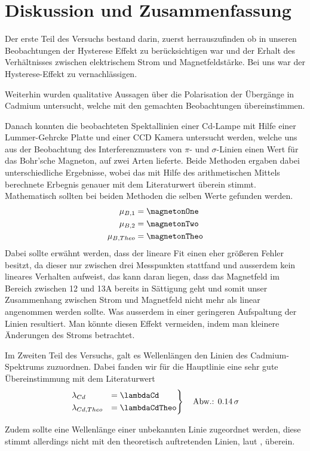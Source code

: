 \section{Diskussion und Zusammenfassung}
  Der erste Teil des Versuchs bestand darin, zuerst herrauszufinden ob in unseren Beobachtungen der Hysterese Effekt zu berücksichtigen war und der Erhalt des Verhältnisses zwischen elektrischem Strom und Magnetfeldstärke.
  Bei uns war der Hysterese-Effekt zu vernachlässigen.

  Weiterhin wurden qualitative Aussagen über die Polarisation der Übergänge in Cadmium untersucht, welche mit den gemachten Beobachtungen übereinstimmen.

  Danach konnten die beobachteten Spektallinien einer Cd-Lampe mit Hilfe einer Lummer-Gehrcke Platte und einer CCD Kamera untersucht werden, welche uns aus der Beobachtung des Interferenzmusters von $\pi$- und $\sigma$-Linien einen Wert für das Bohr'sche Magneton, auf zwei Arten lieferte. Beide Methoden ergaben dabei unterschiedliche Ergebnisse, wobei das mit Hilfe des arithmetischen Mittels berechnete Erbegnis genauer mit dem Literaturwert überein stimmt. Mathematisch sollten bei beiden Methoden die selben Werte gefunden werden.
  \begin{align*}
    \mu_{B,1} &= \magnetonOne\\
    \mu_{B,2} &= \magnetonTwo\\
    \mu_{B,Theo} & = \magnetonTheo
  \end{align*}
  Dabei sollte erwähnt werden, dass der lineare Fit einen eher größeren Fehler besitzt, da dieser nur zwischen drei Messpunkten stattfand und ausserdem kein lineares Verhalten aufweist, das kann daran liegen, dass das Magnetfeld im Bereich zwischen 12 und 13A bereits in Sättigung geht und somit unser Zusammenhang zwischen Strom und Magnetfeld nicht mehr als linear angenommen werden sollte. Was ausserdem in einer geringeren Aufspaltung der Linien resultiert.
  Man könnte diesen Effekt vermeiden, indem man kleinere Änderungen des Stroms betrachtet.

  Im Zweiten Teil des Versuchs, galt es Wellenlängen den Linien des Cadmium-Spektrums zuzuordnen. Dabei fanden wir für die Hauptlinie eine sehr gute Übereinstimmung mit dem Literaturwert
  \begin{align*}
    \begin{rcases}
      \lambda_{Cd} &=\lambdaCd \quad\\
      \lambda_{Cd, Theo} &= \lambdaCdTheo
    \end{rcases}
    \quad\text{Abw.: }\SI{.14}{\sigma}
  \end{align*}

  Zudem sollte eine Wellenlänge einer unbekannten Linie zugeordnet werden, diese stimmt allerdings nicht mit den theoretisch auftretenden Linien, laut \cite{nist.gov.cd}, überein.
